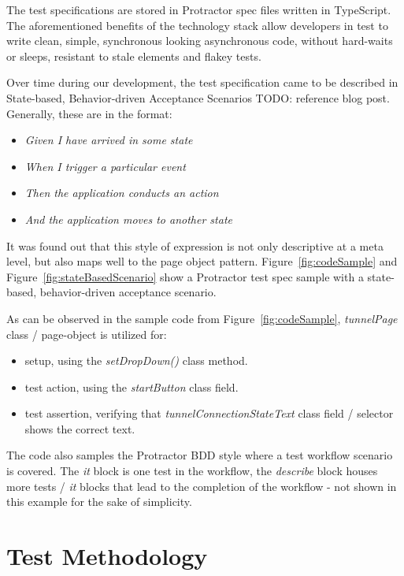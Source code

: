 \documentclass[conference]{IEEEtran}
\newcommand{\todo}[1]{}
\renewcommand{\todo}[1]{{\color{red} TODO: {#1}}}
\begin{document}
	The test specifications are stored in Protractor spec files written in TypeScript. 
	The aforementioned benefits of the technology stack allow developers in test to write clean, simple, synchronous looking asynchronous code, without hard-waits or sleeps, resistant to stale elements and flakey tests.

	Over time during our development, the test specification came to be described in State-based, Behavior-driven Acceptance Scenarios \todo{reference blog post}. 
	Generally, these are in the format:


	\begin{itemize}
		\item [] \textit{Given I have arrived in some state} 
		\item [] \textit{When I trigger a particular event} 
		\item [] \textit{Then the application conducts an action}
		\item [] \textit{And the application moves to another state}
	\end{itemize}

	It was found out that this style of expression is not only descriptive at a meta level, but also maps well to the page object pattern.
	Figure~\ref{fig:codeSample} and Figure~\ref{fig:stateBasedScenario} show a Protractor test spec sample with a state-based, behavior-driven acceptance scenario.
	
	As can be observed in the sample code from Figure~\ref{fig:codeSample}, \textit{tunnelPage} class / page-object is utilized for:
	
	\begin{itemize}
		\item setup, using the \textit{setDropDown()} class method. 
		\item test action, using the \textit{startButton} class field.
		\item test assertion, verifying that \textit{tunnelConnectionStateText} class field / selector shows the correct text.
	\end{itemize}

	The code also samples the Protractor BDD style where a test workflow scenario is covered. 
	The \textit{it} block is one test in the workflow, the \textit{describe} block houses more tests / \textit{it} blocks that lead to the completion of the workflow - not shown in this example for the sake of simplicity.
	
\section{Test Methodology}
	
\end{document}
